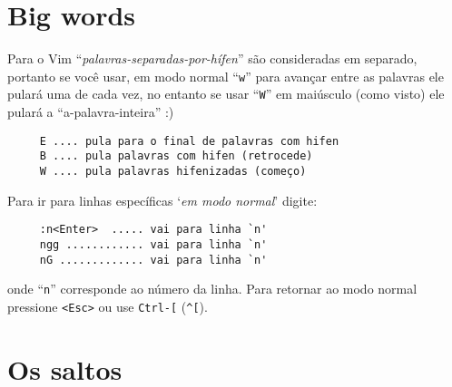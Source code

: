 \section{Big words}
\label{Big words}

Para o Vim ``{\em{palavras-separadas-por-hífen}}'' são consideradas em separado, portanto se você usar,
em modo normal ``\verb+w+'' para avançar entre as palavras ele pulará uma de
cada vez, no entanto se usar ``\verb+W+''
em maiúsculo (como visto) ele pulará a ``a-palavra-inteira'' :)

\begin{verbatim}
     E .... pula para o final de palavras com hifen
     B .... pula palavras com hifen (retrocede)
     W .... pula palavras hifenizadas (começo)
\end{verbatim}



Para ir para linhas específicas `{\em em modo normal}' digite:

\begin{verbatim}
     :n<Enter>  ..... vai para linha `n'
     ngg ............ vai para linha `n'
     nG ............. vai para linha `n'
\end{verbatim}

onde ``\verb|n|'' corresponde ao número da linha.  Para retornar ao modo normal
pressione \verb|<Esc>| ou use \verb|Ctrl-[| (\verb|^[|).

\section{Os saltos}\label{Os saltos}

